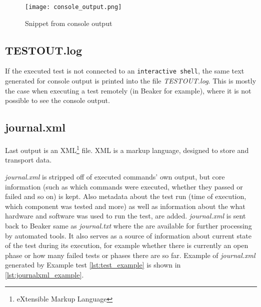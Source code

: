 \begin{figure}[h!]
  \texttt{[image: console\_output.png]}
  \caption{Snippet from console output}
  \label{fig:console_output}
\end{figure}

\subsection{TESTOUT.log}
If the executed test is not connected to an \texttt{interactive shell}, the same text generated for console output is printed into the file \textit{TESTOUT.log}. This is mostly the case when executing a test remotely (in Beaker for example), where it is not possible to see the console output.

\subsection{journal.xml}
Last output is an XML\footnote{eXtensible Markup Language} file. XML is a markup language, designed to store and transport data\cite{xml_intro}.

\textit{journal.xml} is stripped off of executed commands' own output, but core information (such as which commands were executed, whether they passed or failed and so on) is kept. Also metadata about the test run (time of execution, which component was tested and more) as well as information about the what hardware and software was used to run the test, are added. \textit{journal.xml} is sent back to Beaker same as \textit{journal.txt} where the are available for further processing by automated tools. It also serves as a source of information about current state of the test during its execution, for example whether there is currently an open phase or how many failed tests or phases there are so far. Example of \textit{journal.xml} generated by Example test \ref{lst:test_example} is shown in \ref{lst:journalxml_example}.

